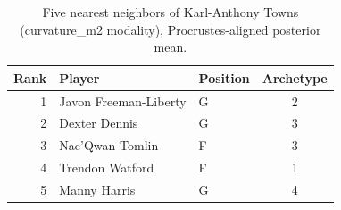 \begin{table}[htbp]
  \centering\small
  \begin{tabular}{rllc}
    \toprule
    Rank & Player & Position & Archetype \\
    \midrule
    1 & Javon Freeman-Liberty & G & 2 \\
    2 & Dexter Dennis & G & 3 \\
    3 & Nae'Qwan Tomlin & F & 3 \\
    4 & Trendon Watford & F & 1 \\
    5 & Manny Harris & G & 4 \\
    \bottomrule
  \end{tabular}
  \caption{Five nearest neighbors of Karl-Anthony Towns (curvature_m2 modality), Procrustes-aligned posterior mean.}
  \label{tab:Karl_Anthony_Towns_neighbors_curvature_m2}
\end{table}


